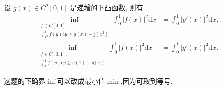 \documentclass[../../main.tex]{subfiles}
\begin{document}
\begin{proposition}
设 $g(x) \in C^2[0,1]$ 是递增的下凸函数, 则有
\begin{align}
\inf_{\substack{f \in C[0,1], \\ \int_{x^2}^x f(y) \mathrm{d}y \geqslant g(x) - g(x^2)}} \int_0^1 |f(x)|^2 \mathrm{d}x &= \int_0^1 |g'(x)|^2 \mathrm{d}x, \label{17.17eq1} \\
\inf_{\substack{f \in C[0,1], \\ \int_x^1 f(y) \mathrm{d}y \geqslant g(1) - g(x)}} \int_0^1 |f(x)|^2 \mathrm{d}x &= \int_0^1 |g'(x)|^2 \mathrm{d}x. \label{17.17eq2}
\end{align}
\end{proposition}
\begin{note}
这题的下确界$\inf$可以改成最小值$\min$,因为可取到等号.
\end{note}
\end{document}
